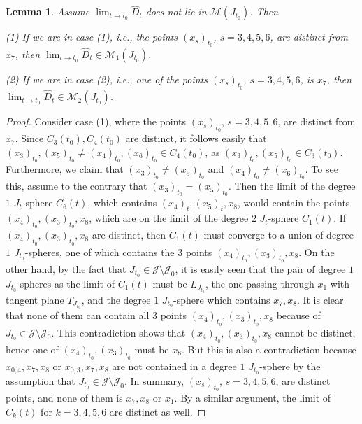 \documentclass[11pt]{amsart}
\theoremstyle{plain}
\numberwithin{theorem}{section}
\newtheorem{lemma}[theorem]{Lemma}
\theoremstyle{definition}
\newcommand{\J}{{\mathcal J}}
\newcommand{\M}{{\mathcal M}}
\begin{document}
\begin{lemma}
Assume $\lim_{t\rightarrow t_0} \hat{D}_t$ does not lie in $\M(J_{t_0})$. Then 

(1) If we are in case (1), i.e., the points $(x_s)_{t_0}$, $s=3,4,5,6$, are distinct from $x_7$, then 
$\lim_{t\rightarrow t_0} \hat{D}_t\in \M_1(J_{t_0})$.

(2) If we are in case (2), i.e., one of the points $(x_s)_{t_0}$, $s=3,4,5,6$, is $x_7$, 
then $\lim_{t\rightarrow t_0} \hat{D}_t\in \M_2(J_{t_0})$.
\end{lemma}

\begin{proof}
Consider case (1), where the points $(x_s)_{t_0}$, $s=3,4,5,6$, are distinct from $x_7$. Since $C_3(t_0),
C_4(t_0)$ are distinct, it follows easily that $(x_3)_{t_0}, (x_5)_{t_0}\neq (x_4)_{t_0}, (x_6)_{t_0}\in C_4(t_0)$,
as $(x_3)_{t_0}, (x_5)_{t_0}\in C_3(t_0)$. Furthermore, we claim that $(x_3)_{t_0}\neq (x_5)_{t_0}$ and 
$(x_4)_{t_0}\neq (x_6)_{t_0}$. To see this, assume to the contrary that $(x_3)_{t_0}=(x_5)_{t_0}$. Then 
the limit of the degree $1$ $J_t$-sphere $C_6(t)$, which contains $(x_4)_t, (x_5)_t, x_8$, would contain the points 
$(x_4)_{t_0}, (x_3)_{t_0}, x_8$, which are on the limit of the degree $2$ $J_t$-sphere $C_1(t)$. If $(x_4)_{t_0}, (x_3)_{t_0}, x_8$ are distinct, then $C_1(t)$ must converge to a union of  degree $1$ $J_{t_0}$-spheres, one of which contains the $3$ points $(x_4)_{t_0}, (x_3)_{t_0}, x_8$. On the other hand, by the fact that $J_{t_0}\in \J\setminus \J_0$, it is easily seen that the pair of degree $1$ $J_{t_0}$-spheres as the limit of $C_1(t)$ must be 
$L_{J_{t_0}}$, the one passing through $x_1$ with tangent plane $T_{J_{t_0}}$, and the degree $1$ 
$J_{t_0}$-sphere which contains $x_7,x_8$. It is clear that none of them can contain all $3$ points 
$(x_4)_{t_0}, (x_3)_{t_0}, x_8$ because of $J_{t_0}\in \J\setminus \J_0$. This contradiction shows that 
$(x_4)_{t_0}, (x_3)_{t_0}, x_8$ cannot be distinct, hence one of $(x_4)_{t_0}, (x_3)_{t_0}$ must be
$x_8$. But this is also a contradiction because $x_{0,4},x_7,x_8$ or $x_{0,3},x_7,x_8$ are not contained in a degree $1$ $J_{t_0}$-sphere by the assumption that $J_{t_0}\in \J\setminus \J_0$. In summary, $(x_s)_{t_0}$, $s=3,4,5,6$, are distinct points, and none of them is $x_7,x_8$ or $x_1$. By a similar argument, the limit of 
$C_k(t)$ for $k=3,4,5,6$ are distinct as well. 


\end{proof}
\end{document}
